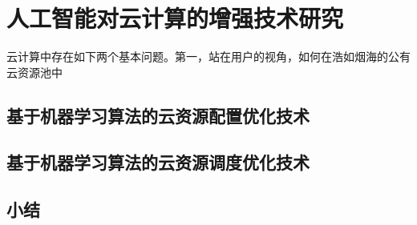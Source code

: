 \chapter{人工智能对云计算的增强技术研究}
云计算中存在如下两个基本问题。第一，站在用户的视角，如何在浩如烟海的公有云资源池中
\section{基于机器学习算法的云资源配置优化技术}

\section{基于机器学习算法的云资源调度优化技术}

\section{小结}